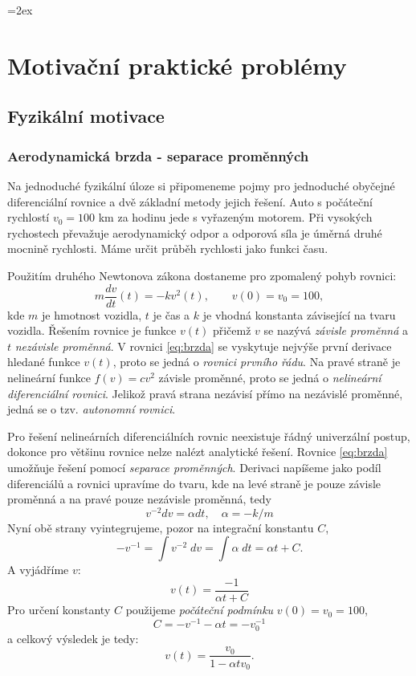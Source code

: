 \documentclass[a4paper, 12pt]{book}
\theoremstyle{definition}
\def\df#1{\emph{#1}}
\begin{document}
\parskip=2ex
\parindent=0pt

\tableofcontents


\chapter{Motivační praktické problémy}
\section{Fyzikální motivace}
\subsection{Aerodynamická brzda - separace proměnných}
Na jednoduché fyzikální úloze si připomeneme pojmy pro jednoduché obyčejné diferenciální rovnice
a dvě základní metody jejich řešení.
Auto s počáteční rychlostí $v_0=100$ km za hodinu jede s vyřazeným motorem. Při vysokých 
rychostech převažuje aerodynamický odpor a odporová síla je úměrná druhé mocnině rychlosti.
Máme určit průběh rychlosti jako funkci času. 

Použitím druhého Newtonova zákona dostaneme pro zpomalený pohyb rovnici:
\begin{equation}
  \label{eq:brzda}
  m\frac{dv}{dt}(t) = -k v^2(t),\qquad v(0)=v_0=100,
\end{equation}
kde $m$ je hmotnost vozidla, $t$ je čas a $k$ je vhodná konstanta závisející na tvaru vozidla.
Řešením rovnice je funkce $v(t)$ přičemž $v$ se nazývá \df{závisle proměnná} a $t$ \df{nezávisle proměnná}.
V rovnici \eqref{eq:brzda} se vyskytuje nejvýše první derivace hledané funkce $v(t)$, proto se jedná 
o \df{rovnici prvního řádu}. Na pravé straně je nelineární funkce $f(v)= cv^2$ závisle proměnné, proto se jedná o \df{nelineární diferenciální rovnici}.
Jelikož pravá strana nezávisí přímo na nezávislé proměnné, jedná se o tzv. \df{autonomní rovnici}.

Pro řešení nelineárních diferenciálních rovnic neexistuje řádný univerzální postup, dokonce pro většinu rovnice nelze nalézt analytické řešení.
Rovnice \eqref{eq:brzda} umožňuje řešení pomocí \df{separace proměnných}. Derivaci napíšeme jako podíl diferenciálů a rovnici upravíme do tvaru, kde 
na levé straně je pouze závisle proměnná a na pravé pouze nezávisle proměnná, tedy
\[
    v^{-2} dv =  \alpha dt, \quad \alpha = -k/m 
\]
Nyní obě strany vyintegrujeme, pozor na integrační konstantu $C$,
\[
    -v^{-1} = \int v^{-2}\; dv = \int \alpha\; dt =\alpha t + C.
\]    
A vyjádříme $v$:
\[
    v(t) = \frac{-1}{\alpha t + C}
\]
Pro určení konstanty $C$ použijeme \df{počáteční podmínku} $v(0) = v_0 = 100$,
\[
  C = -v^{-1} - \alpha t = -v_0^{-1}
\]
a celkový výsledek je tedy:
\[
  v(t) = \frac{v_0}{1-\alpha tv_0}.
\]
\end{document}
